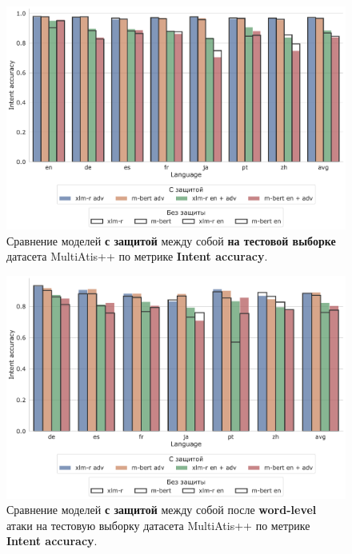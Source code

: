 \begin{figure}[H]
    \centering
    \includegraphics[width=\textwidth]{images/9}
    \caption{Сравнение моделей \textbf{с защитой} между собой \textbf{на тестовой выборке} датасета MultiAtis++ по метрике \textbf{Intent accuracy}.}\label{fig:figure9}
\end{figure}

\begin{figure}[H]
    \centering
    \includegraphics[width=\textwidth]{images/12}
    \caption{Сравнение моделей \textbf{с защитой} между собой после \textbf{word-level} атаки на тестовую выборку датасета MultiAtis++ по метрике \textbf{Intent accuracy}.}\label{fig:figure12}
\end{figure}

